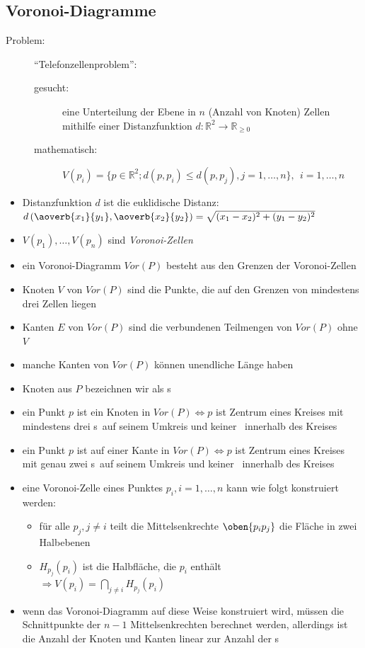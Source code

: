 \subsection{Voronoi-Diagramme}
\begin{description}
	\item[Problem:] ``Telefonzellenproblem'':
		\begin{description}
			\item[gesucht:] eine Unterteilung der Ebene in $n$ (Anzahl von Knoten) Zellen mithilfe einer Distanzfunktion $d:\mathbb{R}^2 \rightarrow \mathbb{R}_{\geq 0}$
			\item[mathematisch:] $V(p_i) = \{p \in \mathbb{R}^2; d(p,p_i) \leq d(p,p_j), j=1,\dots,n\},~~i=1,\dots,n$
		\end{description}
\end{description}
\begin{itemize}
	\item Distanzfunktion $d$ ist die euklidische Distanz:\\
		$d\left(\aoverb{x_1}{y_1},\aoverb{x_2}{y_2}\right) = \sqrt{(x_1-x_2)^2+(y_1-y_2)^2}$
	\item $V(p_1),\dots,V(p_n)$ sind \textit{Voronoi-Zellen}
	\item ein Voronoi-Diagramm $Vor(P)$ besteht aus den Grenzen der Voronoi-Zellen
	\item Knoten $V$ von $Vor(P)$ sind die Punkte, die auf den Grenzen von mindestens drei Zellen liegen
	\item Kanten $E$ von $Vor(P)$ sind die verbundenen Teilmengen von $Vor(P)$ ohne $V$
	\item manche Kanten von $Vor(P)$ können unendliche Länge haben
	\item Knoten aus $P$ bezeichnen wir als \site s
	\item ein Punkt $p$ ist ein Knoten in $Vor(P) \Longleftrightarrow p$ ist Zentrum eines Kreises mit mindestens drei \site s~auf seinem Umkreis und keiner \site~innerhalb des Kreises
	\item ein Punkt $p$ ist auf einer Kante in $Vor(P) \Longleftrightarrow p$ ist Zentrum eines Kreises mit genau zwei \site s~auf seinem Umkreis und keiner \site~innerhalb des Kreises
	\item eine Voronoi-Zelle eines Punktes $p_i,i=1,\dots,n$ kann wie folgt konstruiert werden:
		\begin{itemize}
			\item für alle $p_j,j\neq i$ teilt die Mittelsenkrechte $\oben{p_ip_j}$ die Fläche in zwei Halbebenen
			\item $H_{p_j}(p_i)$ ist die Halbfläche, die $p_i$ enthält\\
			$\Rightarrow V(p_i) = \bigcap\limits_{j\neq i} H_{p_j}(p_i)$
		\end{itemize}
	\item wenn das Voronoi-Diagramm auf diese Weise konstruiert wird, müssen die Schnittpunkte der $n-1$ Mittelsenkrechten berechnet werden, allerdings ist die Anzahl der Knoten und Kanten linear zur Anzahl der \site s
\end{itemize}

